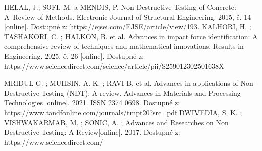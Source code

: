 

\begin{thebibliography}{99}

    HELAL, J.; SOFI, M. a MENDIS, P. Non-Destructive Testing of Concrete: A~Review of Methods. Electronic Journal of Structural Engineering. 2015, č. 14 [online]. Dostupné z: https://ejsei.com/EJSE/article/view/193.
    KALHORI, H. ; TASHAKORI, C. ; HALKON, B. et al. 
    Advances in impact force identification: A comprehensive review of
techniques and mathematical innovations. Results in Engineering. 2025, č. 26 [online]. Dostupné z: https://www.sciencedirect.com/science/article/pii/S259012302501638X
 
MRIDUL G. ; MUHSIN, A. K. ; RAVI B. et al. Advances in applications of Non-Destructive
Testing (NDT): A review. Advances in
Materials and Processing Technologies [online]. 2021. ISSN 2374 0698. Dostupné z: https://www.tandfonline.com/journals/tmpt20?src=pdf
DWIVEDIA, S. K. ; VISHWAKARMAB, M. ; SONIC, A. ; 
Advances and Researches on Non Destructive Testing: A Review[online]. 2017. Dostupné z: https://www.sciencedirect.com/
\end{thebibliography}


%
%
%
